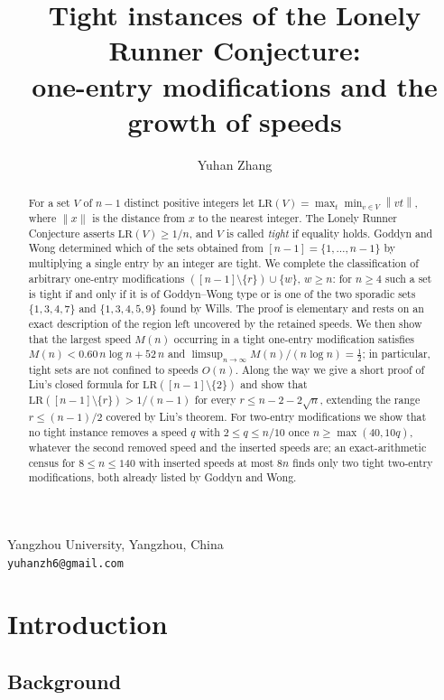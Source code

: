 \documentclass[11pt]{article}
\title{Tight instances of the Lonely Runner Conjecture:\\
one-entry modifications and the growth of speeds}
\author{Yuhan Zhang}
\date{}
\theoremstyle{definition}
\newcommand{\LR}{\mathrm{LR}}
\newcommand{\norm}[1]{\left\lVert #1 \right\rVert}
\begin{document}
\maketitle

\begin{center}
Yangzhou University, Yangzhou, China\\
\texttt{yuhanzh6@gmail.com}
\end{center}

\begin{abstract}
For a set $V$ of $n-1$ distinct positive integers let
$\LR(V)=\max_{t}\min_{v\in V}\norm{vt}$, where $\norm{x}$ is the distance
from $x$ to the nearest integer. The Lonely Runner Conjecture asserts
$\LR(V)\ge 1/n$, and $V$ is called \emph{tight} if equality holds.
Goddyn and Wong determined which of the sets obtained from
$[n-1]=\{1,\dots,n-1\}$ by multiplying a single entry by an integer are
tight. We complete the classification of arbitrary one-entry
modifications $([n-1]\setminus\{r\})\cup\{w\}$, $w\ge n$: for $n\ge4$
such a set is tight if and only if it is of Goddyn--Wong type or is one
of the two sporadic sets $\{1,3,4,7\}$ and $\{1,3,4,5,9\}$ found by
Wills. The proof is elementary and rests on an exact description of the
region left uncovered by the retained speeds. We then show that the
largest speed $M(n)$ occurring in a tight one-entry modification
satisfies $M(n)<0.60\,n\log n+52\,n$ and
$\limsup_{n\to\infty}M(n)/(n\log n)=\tfrac12$; in particular, tight
sets are not confined to speeds $O(n)$. Along the way we give a short
proof of Liu's closed formula for $\LR([n-1]\setminus\{2\})$ and show
that $\LR([n-1]\setminus\{r\})>1/(n-1)$ for every $r\le n-2-2\sqrt n$,
extending the range $r\le(n-1)/2$ covered by Liu's theorem. For
two-entry modifications we show that no tight instance removes a speed
$q$ with $2\le q\le n/10$ once $n\ge\max(40,10q)$, whatever the second
removed speed and the inserted speeds are; an exact-arithmetic census
for $8\le n\le140$ with inserted speeds at most $8n$ finds only two
tight two-entry modifications, both already listed by Goddyn and Wong.
\end{abstract}

\section{Introduction}

\subsection{Background}
\end{document}
